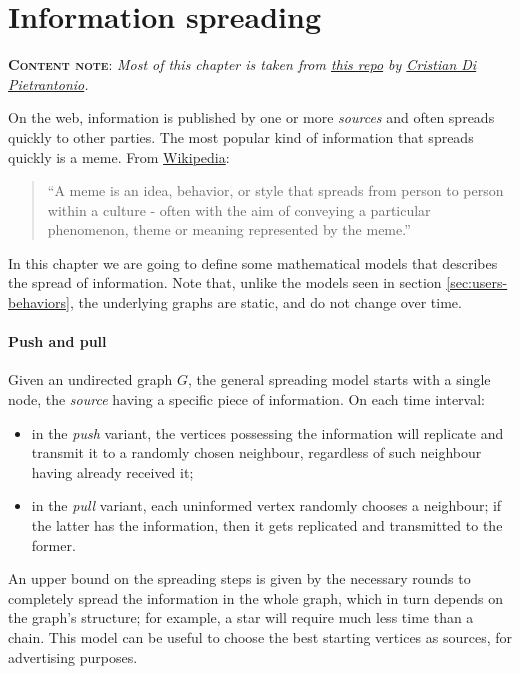\chapter[Information spreading]{Information spreading}

\textbf{\textsc{Content note}}: \emph{Most of this chapter is taken from \href{https://github.com/Halolegend94/uni_social_behavioral_networks/blob/master/chapters/ch01-meme-flow.tex}{this repo} by \href{https://github.com/Halolegend94}{Cristian Di Pietrantonio}.}
\vspace{2ex}

On the web, information is published by one or more \emph{sources} and often spreads quickly to other parties. The most popular kind of information that spreads quickly is a meme. From \href{https://en.wikipedia.org/wiki/Meme}{Wikipedia}:

\begin{quote}
	``A meme is an idea, behavior, or style that spreads from person to person within a culture - often with the aim of conveying a particular phenomenon, theme or meaning represented by the meme.''
\end{quote}

In this chapter we are going to define some mathematical models that describes the spread of information. Note that, unlike  the models seen in section \ref{sec:users-behaviors}, the underlying graphs are static, and do not change over time.

\subsubsection{Push and pull}

Given an undirected graph $G$, the general spreading model starts with a single node, the \emph{source} having a specific piece of information. On each time interval:
\begin{itemize}
    \item in the \emph{push} variant, the vertices possessing the information will replicate and transmit it to a randomly chosen neighbour, regardless of such neighbour having already received it;
    \item in the \emph{pull} variant, each uninformed vertex randomly chooses a neighbour; if the latter has the information, then it gets replicated and transmitted to the former.
\end{itemize}

An upper bound on the spreading steps is given by the necessary rounds to completely spread the information in the whole graph, which in turn depends on the graph's structure; for example, a star will require much less time than a chain. This model can be useful to choose the best starting vertices as sources, for advertising purposes.


